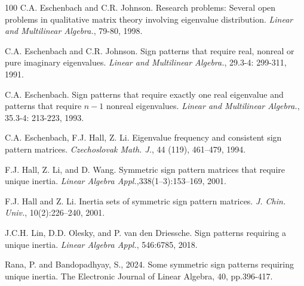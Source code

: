 \documentclass[a4paper, 10pt]{article}
\numberwithin{equation}{section}
\begin{document}
\begin{thebibliography}{100}
	 C.A. Eschenbach and C.R. Johnson. Research problems: Several open problems in qualitative matrix theory involving eigenvalue distribution. \textit{Linear and Multilinear Algebra.}, 79-80, 1998.
	
	
	 C.A. Eschenbach and C.R. Johnson. Sign patterns that require real, nonreal or pure imaginary eigenvalues. \textit{Linear and Multilinear Algebra.}, 29.3-4: 299-311, 1991.
	
	 C.A. Eschenbach. Sign patterns that require exactly one real eigenvalue and patterns that require $n-1$ nonreal eigenvalues. \textit{Linear and Multilinear Algebra.}, 35.3-4: 213-223, 1993.
	
	C.A. Eschenbach, F.J. Hall, Z. Li. Eigenvalue frequency and consistent sign pattern matrices. \textit{Czechoslovak Math. J.}, 44 (119), 461–479, 1994.
	
	
	
	
	
	
	
	
	
	  F.J.  Hall,  Z.  Li,  and  D.  Wang.   Symmetric sign pattern matrices that require unique inertia. \textit{Linear Algebra Appl.},338(1–3):153–169, 2001.
	
	 F.J. Hall and Z. Li.  Inertia sets of symmetric sign pattern matrices. \textit{J. Chin. Univ.}, 10(2):226–240, 2001.
	
	
	 J.C.H. Lin, D.D. Olesky, and P. van den Driessche. Sign patterns requiring a unique inertia. \textit{Linear Algebra Appl.}, 546:67{85, 2018}.
	
	 Rana, P. and Bandopadhyay, S., 2024. Some symmetric sign patterns requiring unique inertia. The Electronic Journal of Linear Algebra, 40, pp.396-417.
\end{thebibliography}	
\end{document}
